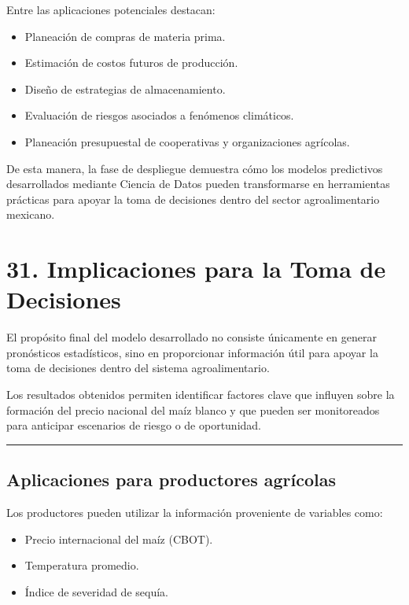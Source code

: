 \documentclass[11pt]{article}
\providecommand{\tightlist}{%
      \setlength{\itemsep}{0pt}\setlength{\parskip}{0pt}}
\begin{document}
Entre las aplicaciones potenciales destacan:

\begin{itemize}
\tightlist
\item
  Planeación de compras de materia prima.
\item
  Estimación de costos futuros de producción.
\item
  Diseño de estrategias de almacenamiento.
\item
  Evaluación de riesgos asociados a fenómenos climáticos.
\item
  Planeación presupuestal de cooperativas y organizaciones agrícolas.
\end{itemize}

De esta manera, la fase de despliegue demuestra cómo los modelos
predictivos desarrollados mediante Ciencia de Datos pueden transformarse
en herramientas prácticas para apoyar la toma de decisiones dentro del
sector agroalimentario mexicano.

    \hypertarget{implicaciones-para-la-toma-de-decisiones}{%
\section{31. Implicaciones para la Toma de
Decisiones}\label{implicaciones-para-la-toma-de-decisiones}}

El propósito final del modelo desarrollado no consiste únicamente en
generar pronósticos estadísticos, sino en proporcionar información útil
para apoyar la toma de decisiones dentro del sistema agroalimentario.

Los resultados obtenidos permiten identificar factores clave que
influyen sobre la formación del precio nacional del maíz blanco y que
pueden ser monitoreados para anticipar escenarios de riesgo o de
oportunidad.

\begin{center}\rule{0.5\linewidth}{0.5pt}\end{center}

\hypertarget{aplicaciones-para-productores-agruxedcolas}{%
\subsection{Aplicaciones para productores
agrícolas}\label{aplicaciones-para-productores-agruxedcolas}}

Los productores pueden utilizar la información proveniente de variables
como:

\begin{itemize}
\tightlist
\item
  Precio internacional del maíz (CBOT).
\item
  Temperatura promedio.
\item
  Índice de severidad de sequía.
\end{itemize}
\end{document}
